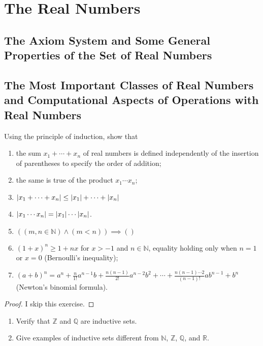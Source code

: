 \chapter{The Real Numbers}

\section{The Axiom System and Some General Properties of the Set
of Real Numbers}

\section{The Most Important Classes of Real Numbers and Computational Aspects of Operations with Real Numbers}

\begin{exercise}
    Using the principle of induction, show that
    \begin{enumerate}[label={(\alph*)}]
        \item the sum $x_{1} + \cdots + x_{n}$ of real numbers is defined independently of the insertion of parentheses to specify the order of addition;
        \item the same is true of the product $x_{1}\cdots x_{n}$;
        \item $\left\vert{x_{1} + \cdots + x_{n}}\right\vert\leq \left\vert{x_{1}}\right\vert + \cdots + \left\vert{x_{n}}\right\vert$
        \item $\left\vert{x_{1}\cdots x_{n}}\right\vert = \left\vert{x_{1}}\right\vert\cdots \left\vert{x_{n}}\right\vert$.
        \item $\left((m, n\in\mathbb{N})\land (m < n)\right)\implies \left(\right)$
        \item ${(1 + x)}^{n}\geq 1 + nx$ for $x > -1$ and $n\in\mathbb{N}$, equality holding only when $n = 1$ or $x = 0$ (Bernoulli's inequality);
        \item ${(a + b)}^{n} = a^{n} + \frac{n}{1!}a^{n-1}b + \frac{n(n-1)}{2!}a^{n-2}b^{2} + \cdots + \frac{n(n-1)\cdots 2}{(n-1)!}ab^{n-1} + b^{n}$ (Newton's binomial formula).
    \end{enumerate}
\end{exercise}

\begin{proof}
    I skip this exercise.
\end{proof}
\newpage

\begin{exercise}
    \begin{enumerate}[label={(\alph*)}]
        \item Verify that $\mathbb{Z}$ and $\mathbb{Q}$ are inductive sets.
        \item Give examples of inductive sets different from $\mathbb{N}$, $\mathbb{Z}$, $\mathbb{Q}$, and $\mathbb{R}$.
    \end{enumerate}
\end{exercise}

